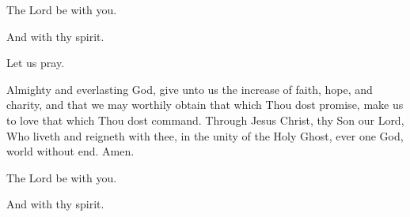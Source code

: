 


\rubric{\Vbar}The Lord be with you.

\rubric{\Rbar}And with thy spirit.

Let us pray.

Almighty and everlasting God, give unto us the increase of faith, hope, and charity, and that we may worthily obtain that which Thou dost promise, make us to love that which Thou dost command. Through Jesus Christ, thy Son our Lord, Who liveth and reigneth with thee, in the unity of the Holy Ghost, ever one God, world without end. \rubric{\Rbar} Amen.

\rubric{\Vbar}The Lord be with you.

\rubric{\Rbar}And with thy spirit.